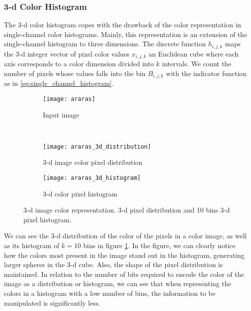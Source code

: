 \subsubsection{3-d Color Histogram}
The 3-d color histogram copes with the drawback of the color representation in single-channel color histograms. Mainly, this representation is an extension of the single-channel histogram to three dimensions. The discrete function $h_{i, j, k}$ maps the 3-d integer vector of pixel color values $x_{i, j, k}$ an Euclidean cube where each axis corresponds to a color dimension divided into $k$ intervals. We count the number of pixels whose values falls into the bin $B_{i,j,k}$ with the indicator function as in \eqref{eq:single_channel_histogram}.

\begin{figure}[!ht]
    \centering
    \begin{subfigure}[b]{0.25\textwidth}
        \texttt{[image: araras]}
        \caption{Input image}
    \end{subfigure} \\
       
    \begin{subfigure}[b]{0.49\textwidth}
        \texttt{[image: araras\_3d\_distribution]}
        \caption{3-d image color pixel distribution}
    \end{subfigure} 
    \begin{subfigure}[b]{0.49\textwidth}
        \texttt{[image: araras\_3d\_histogram]}
        \caption{3-d color pixel histogram}
    \end{subfigure} 
    
    \caption{3-d image color representation. 3-d pixel distribution and 10 bins 3-d pixel histogram.}\label{fig:3d_color_representation}    
\end{figure}

We can see the 3-d distribution of the color of the pixels in a color image, as well as its histogram of $k=10$ bins in figure \ref{fig:3d_color_representation}. In the figure, we can clearly notice how the colors most present in the image stand out in the histogram, generating larger spheres in the 3-d cube. Also, the shape of the pixel distribution is maintained. In relation to the number of bits required to encode the color of the image as a distribution or histogram, we can see that when representing the colors in a histogram with a low number of bins, the information to be manipulated is significantly less. 

